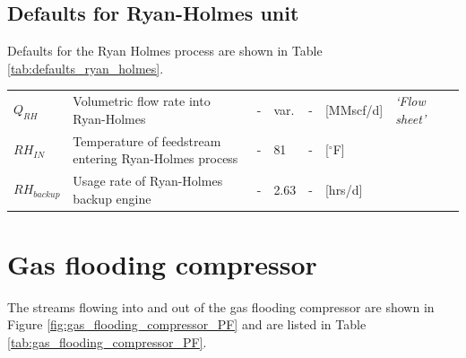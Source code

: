\documentclass[11pt]{report}
\newcommand{\sheet}[1]{\textit{`{#1}'}}
\begin{document}
{\subsection{Defaults for Ryan-Holmes unit}

Defaults for the Ryan Holmes process are shown in Table \ref{tab:defaults_ryan_holmes}.

\begin{landscape}
\begin{scriptsize}
\tablelasttail{\bottomrule}
\label{tab:defaults_ryan_holmes}
\begin{supertabular*}{1\columnwidth}
{p{0.08\columnwidth}p{0.26\columnwidth}p{0.05\columnwidth}p{0.1\columnwidth}p{0.06\columnwidth}p{0.15\columnwidth}p{0.11\columnwidth}p{0.05\columnwidth}}
$Q_{RH}$ & Volumetric flow rate into Ryan-Holmes  & - & var. & - & [MMscf/d] & \sheet{Flow sheet} & \\ 
$RH_{IN}$ & Temperature of feedstream entering Ryan-Holmes process & - & 81 & - & [$^{\circ}${F}] & \cite{NETLRyanHolmesModel} & \\ 
$RH_{backup}$ & Usage rate of Ryan-Holmes backup engine & - & 2.63 & - & [hrs/d] & \cite{NETLRyanHolmesModel} & \\ 
\midrule
\end{supertabular*}
\end{scriptsize}
\end{landscape}


\clearpage

\section{Gas flooding compressor}
\label{sec:gas_flooding_compressor}


The streams flowing into and out of the gas flooding compressor are shown in Figure \ref{fig:gas_flooding_compressor_PF} and are listed in Table \ref{tab:gas_flooding_compressor_PF}.


}
\end{document}
